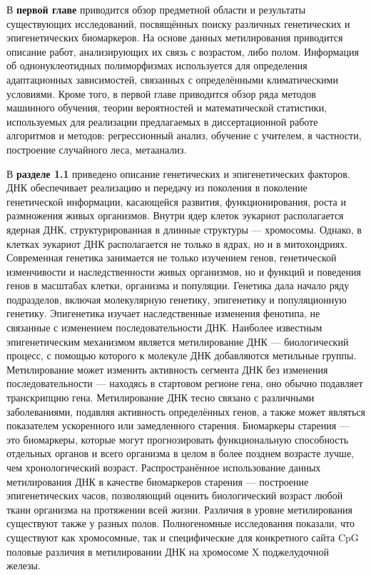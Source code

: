В \textbf{первой главе} приводится обзор предметной области и результаты существующих исследований, посвящённых поиску различных генетических и эпигенетических биомаркеров. На основе данных метилирования приводится описание работ, анализирующих их связь с возрастом, либо полом. Информация об однонуклеотидных полиморфизмах используется для определения адаптационных зависимостей, связанных с определёнными климатическими условиями. Кроме того, в первой главе приводится обзор ряда методов машинного обучения, теории вероятностей и математической статистики, используемых для реализации предлагаемых в диссертационной работе алгоритмов и методов: регрессионный анализ, обучение с учителем, в частности, построение случайного леса, метаанализ.

В \textbf{разделе 1.1} приведено описание генетических и эпигенетических факторов. ДНК обеспечивает реализацию и передачу из поколения в поколение генетической информации, касающейся развития, функционирования, роста и размножения живых организмов. Внутри ядер клеток эукариот располагается ядерная ДНК, структурированная в длинные структуры --- хромосомы. Однако, в клетках эукариот ДНК располагается не только в ядрах, но и в митохондриях. Современная генетика занимается не только изучением генов, генетической изменчивости и наследственности живых организмов, но и функций и поведения генов в масштабах клетки, организма и популяции. Генетика дала начало ряду подразделов, включая молекулярную генетику, эпигенетику и популяционную генетику. Эпигенетика изучает наследственные изменения фенотипа, не связанные с изменением последовательности ДНК. Наиболее известным эпигенетическим механизмом является метилирование ДНК --- биологический процесс, с помощью которого к молекуле ДНК добавляются метильные группы. Метилирование может изменить активность сегмента ДНК без изменения последовательности --- находясь в стартовом регионе гена, оно обычно подавляет транскрипцию гена. Метилирование ДНК тесно связано с различными заболеваниями, подавляя активность определённых генов, а также может являться показателем ускоренного или замедленного старения. Биомаркеры старения --- это биомаркеры, которые могут прогнозировать функциональную способность отдельных органов и всего организма в целом в более позднем возрасте лучше, чем хронологический возраст. Распространённое использование данных метилирования ДНК в качестве биомаркеров старения --- построение эпигенетических часов, позволяющий оценить биологический возраст любой ткани организма на протяжении всей жизни. Различия в уровне метилирования существуют также у разных полов. Полногеномные исследования показали, что существуют как хромосомные, так и специфические для конкретного сайта CpG половые различия в метилировании ДНК на хромосоме X поджелудочной железы. 

